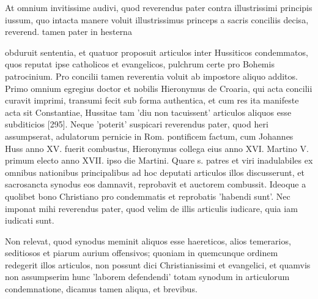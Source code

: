 At omnium invitissime audivi, quod reverendus pater contra illustrissimi principis iussum, quo intacta manere voluit illustrissimus princeps a sacris conciliis decisa, reverend. tamen pater in hesterna

obduruit sententia, et quatuor proposuit articulos inter Hussiticos condemmatos, quos reputat ipse catholicos et evangelicos, pulchrum certe pro Bohemis patrocinium. Pro concilii tamen reverentia voluit ab impostore aliquo additos. Primo omnium egregius doctor et nobilis Hieronymus de Croaria, qui acta concilii curavit imprimi, transumi fecit sub forma authentica, et cum res ita manifeste acta sit Constantiae, Hussitae tam 'diu non tacuissent' articulos aliquos esse subditicios [295]. Neque 'poterit' suspicari reverendus pater, quod heri assumpserat, adulatorum pernicie in Rom. pontificem factum, cum Johannes Huss anno XV. fuerit combustus, Hieronymus collega eius anno XVI. Martino V. primum electo anno XVII. ipso die Martini. Quare s. patres et viri inadulabiles ex omnibus nationibus principalibus ad hoc deputati articulos illos discusserunt, et sacrosancta synodus eos damnavit, reprobavit et auctorem combussit. Ideoque a quolibet bono Christiano pro condemmatis et reprobatis 'habendi sunt'. Nec imponat mihi reverendus pater, quod velim de illis articulis iudicare, quia iam iudicati sunt.

Non relevat, quod synodus meminit aliquos esse haereticos, alios temerarios, seditiosos et piarum aurium offensivos; quoniam in quemcunque ordinem redegerit illos articulos, non possunt dici Christianissimi et evangelici, et quamvis non assumpserim hunc 'laborem defendendi' totam synodum in articulorum condemnatione, dicamus tamen aliqua, et brevibus.

